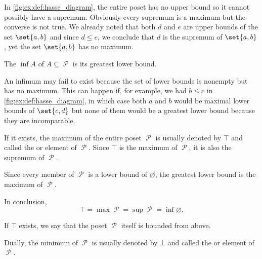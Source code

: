 \begin{definition}
\begin{thmenum}
\begin{minipage}[t]{0.45\textwidth}
      In \cref{fig:ex:def:hasse_diagram}, the entire poset has no upper bound so it cannot possibly have a supremum. Obviously every supremum is a maximum but the converse is not true. We already noted that both \( d \) and \( e \) are upper bounds of the set \( \set{ a, b } \) and since \( d \leq e \), we conclude that \( d \) is the supremum of \( \set{ a, b } \), yet the set \( \set{ a, b } \) has no maximum.
    \end{minipage}
    \hspace{0.02\textwidth}
    \begin{minipage}[t]{0.45\textwidth}
      The  \( \inf A \) of \( A \subseteq \mscrP \) is its greatest lower bound.

      An infimum may fail to exist because the set of lower bounds is nonempty but has no maximum. This can happen if, for example, we had \( b \leq c \) in \cref{fig:ex:def:hasse_diagram}, in which case both \( a \) and \( b \) would be maximal lower bounds of \( \set{ c, d } \) but none of them would be a greatest lower bound because they are incomparable.
    \end{minipage}

    \begin{minipage}[t]{0.45\textwidth}
      If it exists, the maximum of the entire poset \( \mscrP \) is usually denoted by \( \top \) and called the  or  element of \( \mscrP \). Since \( \top \) is the maximum of \( \mscrP \), it is also the supremum of \( \mscrP \).

      Since every member of \( \mscrP \) is a lower bound of \( \varnothing \), the greatest lower bound is the maximum of \( \mscrP \).

      In conclusion,
      \begin{equation*}
        \top = \max \mscrP = \sup \mscrP = \inf \varnothing.
      \end{equation*}

      If \( \top \) exists, we say that the poset \( \mscrP \) itself is bounded from above.
    \end{minipage}
    \hspace{0.02\textwidth}
    \begin{minipage}[t]{0.45\textwidth}
      Dually, the minimum of \( \mscrP \) is usually denoted by \( \bot \) and called the  or  element of \( \mscrP \).


\end{minipage}
\end{thmenum}
\end{definition}
